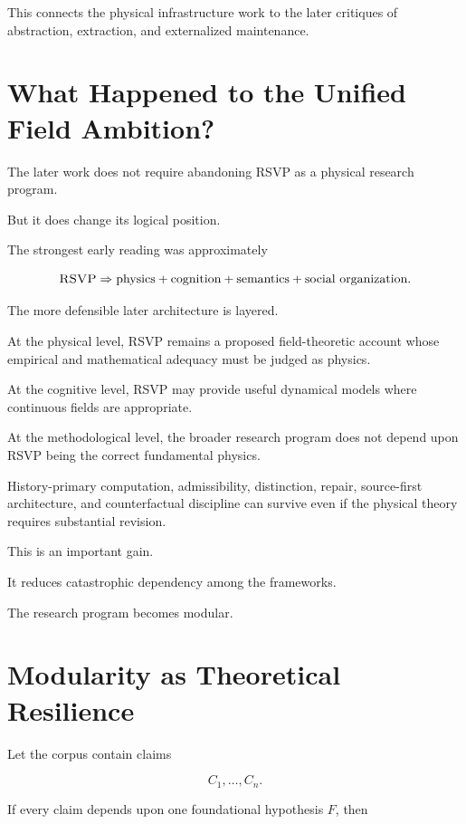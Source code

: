 \documentclass[11pt]{article}
\theoremstyle{remark}
\newcommand{\RSVP}{\textsc{RSVP}}
\begin{document}
This connects the physical infrastructure work to the later critiques of abstraction, extraction, and externalized maintenance.

\section{What Happened to the Unified Field Ambition?}

The later work does not require abandoning \RSVP{} as a physical research program.

But it does change its logical position.

The strongest early reading was approximately

\begin{equation}
\RSVP
\Rightarrow
\text{physics}
+
\text{cognition}
+
\text{semantics}
+
\text{social organization}.
\end{equation}

The more defensible later architecture is layered.

At the physical level, \RSVP{} remains a proposed field-theoretic account whose empirical and mathematical adequacy must be judged as physics.

At the cognitive level, \RSVP{} may provide useful dynamical models where continuous fields are appropriate.

At the methodological level, the broader research program does not depend upon \RSVP{} being the correct fundamental physics.

History-primary computation, admissibility, distinction, repair, source-first architecture, and counterfactual discipline can survive even if the physical theory requires substantial revision.

This is an important gain.

It reduces catastrophic dependency among the frameworks.

The research program becomes modular.

\section{Modularity as Theoretical Resilience}

Let the corpus contain claims

\begin{equation}
C_1,\ldots,C_n.
\end{equation}

If every claim depends upon one foundational hypothesis $F$, then
\end{document}
